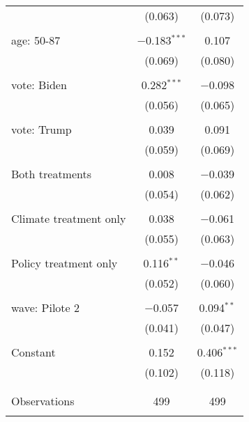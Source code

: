 \begin{tabular}{@{\extracolsep{5pt}}lcc}
  & (0.063) & (0.073) \\ 
  & & \\ 
 age: 50-87 & $-$0.183$^{***}$ & 0.107 \\ 
  & (0.069) & (0.080) \\ 
  & & \\ 
 vote: Biden & 0.282$^{***}$ & $-$0.098 \\ 
  & (0.056) & (0.065) \\ 
  & & \\ 
 vote: Trump & 0.039 & 0.091 \\ 
  & (0.059) & (0.069) \\ 
  & & \\ 
 Both treatments & 0.008 & $-$0.039 \\ 
  & (0.054) & (0.062) \\ 
  & & \\ 
 Climate treatment only & 0.038 & $-$0.061 \\ 
  & (0.055) & (0.063) \\ 
  & & \\ 
 Policy treatment only & 0.116$^{**}$ & $-$0.046 \\ 
  & (0.052) & (0.060) \\ 
  & & \\ 
 wave: Pilote 2 & $-$0.057 & 0.094$^{**}$ \\ 
  & (0.041) & (0.047) \\ 
  & & \\ 
 Constant & 0.152 & 0.406$^{***}$ \\ 
  & (0.102) & (0.118) \\ 
  & & \\ 
\hline \\[-1.8ex] 

Observations & 499 & 499 \\ 
\hline 
\hline \\[-1.8ex] 
\end{tabular} 